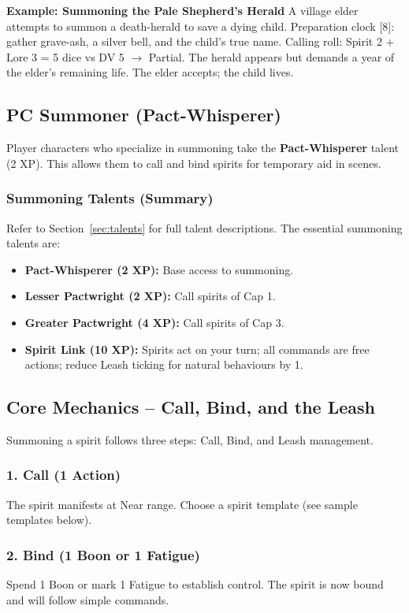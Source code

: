 \textbf{Example: Summoning the Pale Shepherd's Herald}
A village elder attempts to summon a death-herald to save a dying child. Preparation clock [8]: gather grave-ash, a silver bell, and the child's true name. Calling roll: Spirit 2 + Lore 3 = 5 dice vs DV 5 $\rightarrow$ Partial. The herald appears but demands a year of the elder's remaining life. The elder accepts; the child lives.

\subsection{PC Summoner (Pact-Whisperer)}

Player characters who specialize in summoning take the \textbf{Pact-Whisperer} talent (2 XP). This allows them to call and bind spirits for temporary aid in scenes.

\subsubsection{Summoning Talents (Summary)}

Refer to Section~\ref{sec:talents} for full talent descriptions. The essential summoning talents are:
\begin{itemize}
  \item \textbf{Pact-Whisperer (2 XP):} Base access to summoning.
  \item \textbf{Lesser Pactwright (2 XP):} Call spirits of Cap 1.
  \item \textbf{Greater Pactwright (4 XP):} Call spirits of Cap 3.
  \item \textbf{Spirit Link (10 XP):} Spirits act on your turn; all commands are free actions; reduce Leash ticking for natural behaviours by 1.
\end{itemize}

\subsection{Core Mechanics – Call, Bind, and the Leash}

Summoning a spirit follows three steps: Call, Bind, and Leash management.

\subsubsection{1. Call (1 Action)}
The spirit manifests at Near range. Choose a spirit template (see sample templates below).

\subsubsection{2. Bind (1 Boon or 1 Fatigue)}
Spend 1 Boon or mark 1 Fatigue to establish control. The spirit is now bound and will follow simple commands.

